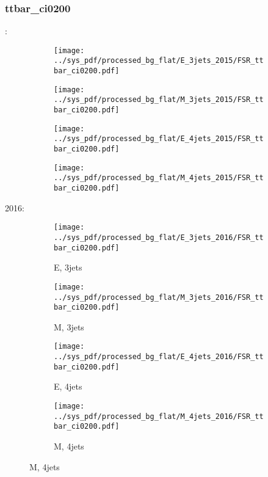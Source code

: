 \documentclass{beamer}
\begin{document}
\begin{frame}
\frametitle{ttbar_ci0200}
\fontsize{5}{1}:
\begin{figure}
\centering
\begin{subfigure}[b]{0.24\textwidth}
\texttt{[image: ../sys\_pdf/processed\_bg\_flat/E\_3jets\_2015/FSR\_ttbar\_ci0200.pdf]}
\end{subfigure}
\begin{subfigure}[b]{0.24\textwidth}
\texttt{[image: ../sys\_pdf/processed\_bg\_flat/M\_3jets\_2015/FSR\_ttbar\_ci0200.pdf]}
\end{subfigure}
\begin{subfigure}[b]{0.24\textwidth}
\texttt{[image: ../sys\_pdf/processed\_bg\_flat/E\_4jets\_2015/FSR\_ttbar\_ci0200.pdf]}
\end{subfigure}
\begin{subfigure}[b]{0.24\textwidth}
\texttt{[image: ../sys\_pdf/processed\_bg\_flat/M\_4jets\_2015/FSR\_ttbar\_ci0200.pdf]}
\end{subfigure}
\end{figure}
2016:
\begin{figure}
\centering
\begin{subfigure}[b]{0.24\textwidth}
\texttt{[image: ../sys\_pdf/processed\_bg\_flat/E\_3jets\_2016/FSR\_ttbar\_ci0200.pdf]}
\captionsetup{font=tiny}
\caption{E, 3jets}
\end{subfigure}
\begin{subfigure}[b]{0.24\textwidth}
\texttt{[image: ../sys\_pdf/processed\_bg\_flat/M\_3jets\_2016/FSR\_ttbar\_ci0200.pdf]}
\captionsetup{font=tiny}
\caption{M, 3jets}
\end{subfigure}
\begin{subfigure}[b]{0.24\textwidth}
\texttt{[image: ../sys\_pdf/processed\_bg\_flat/E\_4jets\_2016/FSR\_ttbar\_ci0200.pdf]}
\captionsetup{font=tiny}
\caption{E, 4jets}
\end{subfigure}
\begin{subfigure}[b]{0.24\textwidth}
\texttt{[image: ../sys\_pdf/processed\_bg\_flat/M\_4jets\_2016/FSR\_ttbar\_ci0200.pdf]}
\captionsetup{font=tiny}
\caption{M, 4jets}
\end{subfigure}
\end{figure}
\end{frame}
\end{document}
